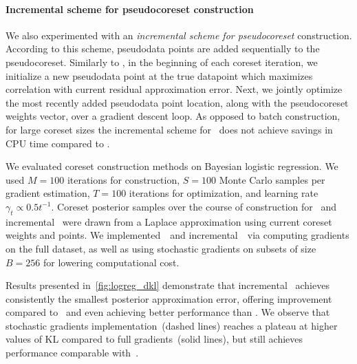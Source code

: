 \paragraph{Incremental scheme for pseudocoreset construction} We also experimented with an \emph{incremental scheme for pseudocoreset} construction. According to this scheme, pseudodata points are added sequentially to the pseudocoreset. Similarly to \sparsevi, in the beginning of each coreset iteration, we initialize a new pseudodata point at the true datapoint which maximizes correlation with current residual approximation error. Next, we jointly optimize the most recently added pseudodata point location, along with the pseudocoreset weights vector, over a gradient descent loop.  As opposed to batch construction, for large coreset sizes the incremental scheme for \psvi~does not achieve savings in CPU time compared to \sparsevi.

We evaluated coreset construction methods on Bayesian logistic regression. We used $M=100$ iterations for construction, $ S=100 $ Monte Carlo samples per gradient estimation, $ T= 100$ iterations for optimization, and learning rate $\gamma_t \propto 0.5t^{-1}$. Coreset posterior samples over the course of construction
for \sparsevi~and incremental \psvi~were drawn from a Laplace approximation using current
coreset weights and points. We implemented~\sparsevi~and incremental~\psvi~via computing gradients on the full dataset, as well as using stochastic gradients on subsets of size $B=256$ for lowering computational cost. 

Results presented in~\cref{fig:logreg_dkl} demonstrate that incremental \psvi~achieves consistently the smallest posterior approximation error, offering improvement
compared to \sparsevi~and even achieving better performance than \gigao. %
We observe that stochastic gradients implementation~(dashed lines) reaches a plateau at higher values of KL compared to full gradients~(solid lines), but still achieves performance comparable with~\gigao.







